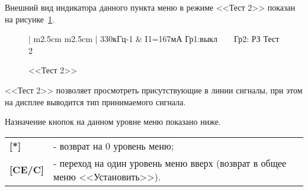 Внешний вид индикатора данного пункта меню в режиме <<Тест 2>> показан на рисунке~\ref{fig:setup_test_2}.
 
\begin{figure}[H]
	\centering
	
	\begin{tabular}{| m{2.5cm}  m{2.5cm} |}
		\firsthline
		330кГц-1	& \raggedleft I1=167мА			\tabularnewline 
		 {Гр1:выкл~~~~Гр2: РЗ}	\tabularnewline
		 {} 					\tabularnewline 
		 {Тест 2}				\tabularnewline 
		\lasthline
	\end{tabular} 
	
	\caption{<<Тест 2>>}
	\label{fig:setup_test_2}
\end{figure}

<<Тест 2>> позволяет просмотреть присутствующие в линии сигналы, при этом на дисплее выводится тип принимаемого сигнала.

Назначение кнопок на данном уровне меню показано ниже.
\begin{center}
	\begin{tabular}{p{2cm} p{15cm}}
		\textbf{[*]} 			& - возврат на 0 уровень меню; \tabularnewline
		\textbf{[CE/C]} 		& - переход на один уровень меню вверх (возврат в общее меню <<Установить>>). \tabularnewline				
	\end{tabular}
\end{center} 
